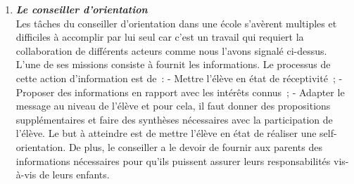 \begin{enumerate}
	\item \textit{\textbf{Le conseiller d'orientation}} \\
	Les tâches du conseiller d’orientation dans une école s’avèrent multiples et difficiles à accomplir par lui seul car c’est un travail qui requiert la collaboration de différents acteurs comme nous l’avons signalé ci-dessus. L’une de ses missions consiste à fournit les informations.
	Le processus de cette action d’information est de :
	-	Mettre l’élève en état de réceptivité ;
	-	Proposer des informations en rapport avec les intérêts connus ;
	-	Adapter le message au niveau de l’élève et pour cela, il faut donner des propositions supplémentaires et faire des synthèses nécessaires avec la participation de l’élève.
	Le but à atteindre est de mettre l’élève en état de réaliser une self-orientation. De plus, le conseiller a le devoir de fournir aux parents des informations nécessaires pour qu’ils puissent assurer leurs responsabilités vis-à-vis de leurs enfants.
\end{enumerate}
